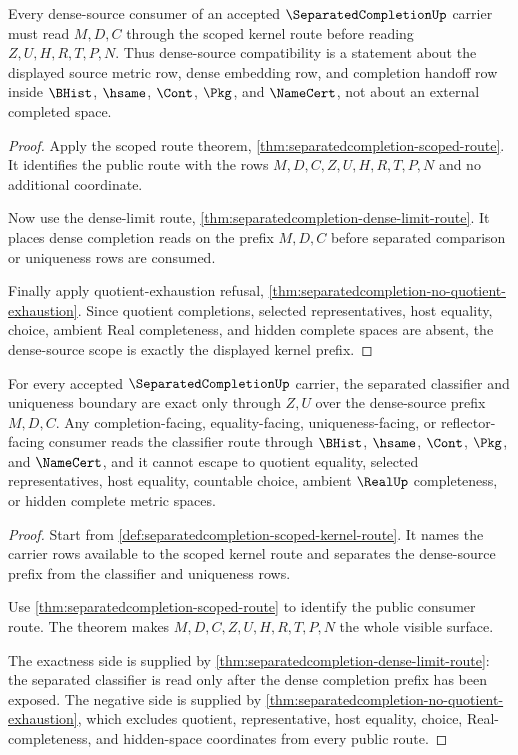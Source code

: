 \begin{theorem}
\label{thm:separatedcompletion-dense-source-scope}
Every dense-source consumer of an accepted $\SeparatedCompletionUp$ carrier must read $M,D,C$ through the scoped kernel route before reading $Z,U,H,R,T,P,N$. Thus dense-source compatibility is a statement about the displayed source metric row, dense embedding row, and completion handoff row inside $\BHist$, $\hsame$, $\Cont$, $\Pkg$, and $\NameCert$, not about an external completed space.
\end{theorem}
\begin{proof}
Apply the scoped route theorem, \autoref{thm:separatedcompletion-scoped-route}. It identifies the public route with the rows $M,D,C,Z,U,H,R,T,P,N$ and no additional coordinate.

Now use the dense-limit route, \autoref{thm:separatedcompletion-dense-limit-route}. It places dense completion reads on the prefix $M,D,C$ before separated comparison or uniqueness rows are consumed.

Finally apply quotient-exhaustion refusal, \autoref{thm:separatedcompletion-no-quotient-exhaustion}. Since quotient completions, selected representatives, host equality, choice, ambient Real completeness, and hidden complete spaces are absent, the dense-source scope is exactly the displayed kernel prefix.
\end{proof}

\begin{theorem}
\label{thm:separatedcompletion-classifier-nonescape-scope}
For every accepted $\SeparatedCompletionUp$ carrier, the separated classifier and uniqueness boundary are exact only through $Z,U$ over the dense-source prefix $M,D,C$. Any completion-facing, equality-facing, uniqueness-facing, or reflector-facing consumer reads the classifier route through $\BHist$, $\hsame$, $\Cont$, $\Pkg$, and $\NameCert$, and it cannot escape to quotient equality, selected representatives, host equality, countable choice, ambient $\RealUp$ completeness, or hidden complete metric spaces.
\end{theorem}
\begin{proof}
Start from \autoref{def:separatedcompletion-scoped-kernel-route}. It names the carrier rows available to the scoped kernel route and separates the dense-source prefix from the classifier and uniqueness rows.

Use \autoref{thm:separatedcompletion-scoped-route} to identify the public consumer route. The theorem makes $M,D,C,Z,U,H,R,T,P,N$ the whole visible surface.

The exactness side is supplied by \autoref{thm:separatedcompletion-dense-limit-route}: the separated classifier is read only after the dense completion prefix has been exposed. The negative side is supplied by \autoref{thm:separatedcompletion-no-quotient-exhaustion}, which excludes quotient, representative, host equality, choice, Real-completeness, and hidden-space coordinates from every public route.
\end{proof}

